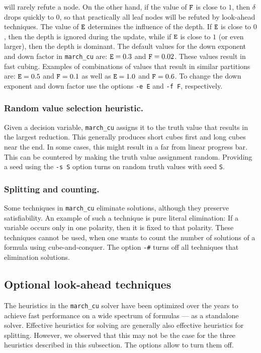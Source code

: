 \documentclass{llncs}
\begin{document}
will rarely refute a node. On the other hand, if the value of ${\tt F}$ is close to $1$, then $\delta$ drops quickly 
to $0$, so that practically all leaf nodes will be refuted by look-ahead techniques. The value of ${\tt E}$ determines
the influence of the depth. If ${\tt E}$ is close to $0$, then the depth is ignored during the update, while if ${\tt E}$ is
close to $1$ (or even larger), then the depth is dominant.  
The default values for the down exponent and down factor in {\tt march\_cu} are: ${\tt E} = 0.3$ and ${\tt F} = 0. 02$.
These values result in fast cubing. Examples of combinations of values that result in similar partitions are:
${\tt E} = 0.5$ and ${\tt F} = 0.1$ as well as ${\tt E} = 1.0$ and ${\tt F} = 0.6$. To change the down exponent and down factor
use the options {\tt -e E} and {\tt -f F}, respectively.


\subsubsection{Random value selection heuristic.} Given a decision variable, {\tt march\_cu} assigns it to the truth value that results
in the largest reduction. This generally produces short cubes first and long cubes near the end. In some cases, this might
result in a far from linear progress bar. This can be countered by making the truth value assignment random. Providing a seed
using the {\tt -s S} option turns on random truth values with seed {\tt S}.

\subsubsection{Splitting and counting.} Some techniques in {\tt march\_cu} eliminate solutions, although they preserve satisfiability.
An example of such a technique is pure literal elimination: If a variable occurs only in one polarity, then it is fixed to that polarity. 
These techniques cannot be used, when one wants to count the number of solutions of a formula using cube-and-conquer. The
option {\tt -\#} turns off all techniques that elimination solutions.


\subsection{Optional look-ahead techniques}

The heuristics in the {\tt march\_cu} solver have been optimized over the years to achieve fast performance on a wide spectrum
of formulas --- as a standalone solver. Effective heuristics for solving are generally also effective heuristics for splitting. However,
we observed that this may not be the case for the three heuristics described in this subsection. The options allow to turn
them off. 
\end{document}
